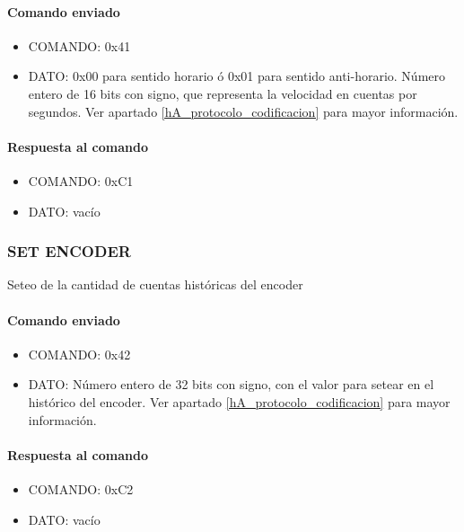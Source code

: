 \paragraph*{Comando enviado}

\begin{itemize}
	\item{COMANDO:} 0x41
	\item{DATO:} 0x00 para sentido horario \'o 0x01 para sentido anti-horario.
		N\'umero entero de 16 bits con signo, que representa la velocidad en cuentas por segundos.
		Ver apartado \ref{hA_protocolo_codificacion} para mayor informaci\'on.
\end{itemize}

\paragraph*{Respuesta al comando}

\begin{itemize}
	\item{COMANDO:} 0xC1
	\item{DATO:} vac\'io
\end{itemize}

\subsubsection{SET ENCODER}
\label{hA_protocolo_set_encoder}

Seteo de la cantidad de cuentas hist\'oricas del encoder

\paragraph*{Comando enviado}

\begin{itemize}
	\item{COMANDO:} 0x42
	\item{DATO:} N\'umero entero de 32 bits con signo, con el valor para setear en el hist\'orico del encoder.
		Ver apartado \ref{hA_protocolo_codificacion} para mayor informaci\'on.
\end{itemize}

\paragraph*{Respuesta al comando}

\begin{itemize}
	\item{COMANDO:} 0xC2
	\item{DATO:} vac\'io
\end{itemize}

